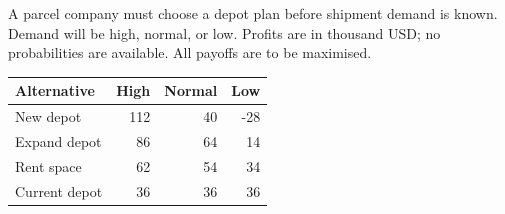 \clearpage
{}
A parcel company must choose a depot plan before shipment demand is known. Demand will be high, normal, or low. Profits are in thousand USD; no probabilities are available. All payoffs are to be maximised.
\begin{center}\small\setlength{\tabcolsep}{4pt}
\begin{tabular}{@{}lrrr@{}}\toprule
Alternative&High&Normal&Low\\\midrule
New depot&112&40&-28\\
Expand depot&86&64&14\\
Rent space&62&54&34\\
Current depot&36&36&36\\\bottomrule
\end{tabular}\end{center}
